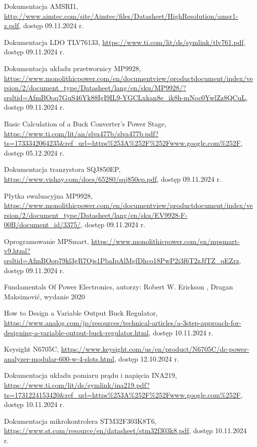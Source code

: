 \begin{thebibliography}{}
 Dokumentacja AMSRI1, \url{http://www.aimtec.com/site/Aimtec/files/Datasheet/HighResolution/amsr1-z.pdf}, dostęp 09.11.2024 r.

 Dokumentacja LDO TLV76133, \url{https://www.ti.com/lit/ds/symlink/tlv761.pdf}, dostęp 09.11.2024 r.

 Dokumentacja układu przetwornicy MP9928, \url{https://www.monolithicpower.com/en/documentview/productdocument/index/version/2/document_type/Datasheet/lang/en/sku/MP9928/?srsltid=AfmBOoq7GuS46Yk88IgI9IL9-YGCLxkan8e_ik8h-mNoc0YwlZz8QCuL}, dostęp 09.11.2024 r.

 Basic Calculation of a Buck Converter's Power Stage, \url{https://www.ti.com/lit/an/slva477b/slva477b.pdf?ts=1733342064235&ref_url=https%253A%252F%252Fwww.google.com%252F}, dostęp 05.12.2024 r.

 Dokumentacja tranzystora SQJ850EP, \url{https://www.vishay.com/docs/65280/sqj850ep.pdf}, dostęp 09.11.2024 r.

 Płytka ewaluacyjna MP9928, \url{https://www.monolithicpower.com/en/documentview/productdocument/index/version/2/document_type/Datasheet/lang/en/sku/EV9928-F-00B/document_id/3375/}, dostęp 09.11.2024 r.

 Oprogramowanie MPSmart, \url{https://www.monolithicpower.com/en/mpsmart-v9.html?srsltid=AfmBOop79kl3gR7Ojs1PbaIpAlMgfDhco18PwP2i3f6T2zJfTZ_qEZrz}, dostęp 09.11.2024 r.

 Fundamentals Of Power Electronics, autorzy:  Robert W. Erickson , Dragan Maksimović, wydanie 2020

 How to Design a Variable Output Buck Regulator, \url{https://www.analog.com/jp/resources/technical-articles/a-3step-approach-for-designing-a-variable-output-buck-regulator.html}, dostęp 10.11.2024 r.

 Keysight N6705C, \url{https://www.keysight.com/us/en/product/N6705C/dc-power-analyzer-modular-600-w-4-slots.html}, dostęp 12.10.2024 r.

 Dokumentacja układu pomiaru prądu i napięcia INA219, \url{https://www.ti.com/lit/ds/symlink/ina219.pdf?ts=1731224153420&ref_url=https%253A%252F%252Fwww.google.com%252F}, dostęp 10.11.2024 r.

 Dokumentacja mikrokontrolera STM32F303K8T6, \url{https://www.st.com/resource/en/datasheet/stm32f303k8.pdf}, dostęp 10.11.2024 r.


\end{thebibliography}

